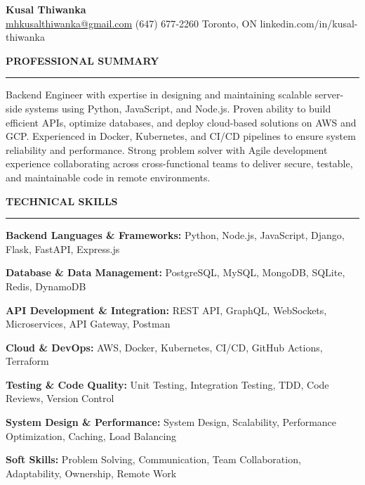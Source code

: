 \documentclass[10pt,letterpaper]{article}
\begin{document}
\begin{center}
{\LARGE\textbf{Kusal Thiwanka}}\\[3pt]
\href{mailto:mhkusalthiwanka@gmail.com}{mhkusalthiwanka@gmail.com}\hspace{2em}%
(647) 677{-}2260\hspace{2em}%
Toronto, ON\hspace{2em}
linkedin.com/in/kusal-thiwanka
\end{center}

\vspace{6pt}

\textbf{PROFESSIONAL SUMMARY}\\[-8pt]
\noindent\rule{\textwidth}{1pt}

\vspace{-2pt}

Backend Engineer with expertise in designing and maintaining scalable server-side systems using Python, JavaScript, and Node.js. Proven ability to build efficient APIs, optimize databases, and deploy cloud-based solutions on AWS and GCP. Experienced in Docker, Kubernetes, and CI/CD pipelines to ensure system reliability and performance. Strong problem solver with Agile development experience collaborating across cross-functional teams to deliver secure, testable, and maintainable code in remote environments.

\vspace{8pt}

\textbf{TECHNICAL SKILLS}\\[-8pt]
\noindent\rule{\textwidth}{1pt}

\vspace{-2pt}

\textbf{Backend Languages \& Frameworks:} Python, Node.js, JavaScript, Django, Flask, FastAPI, Express.js

\textbf{Database \& Data Management:} PostgreSQL, MySQL, MongoDB, SQLite, Redis, DynamoDB

\textbf{API Development \& Integration:} REST API, GraphQL, WebSockets, Microservices, API Gateway, Postman

\textbf{Cloud \& DevOps:} AWS, Docker, Kubernetes, CI/CD, GitHub Actions, Terraform

\textbf{Testing \& Code Quality:} Unit Testing, Integration Testing, TDD, Code Reviews, Version Control

\textbf{System Design \& Performance:} System Design, Scalability, Performance Optimization, Caching, Load Balancing

\textbf{Soft Skills:} Problem Solving, Communication, Team Collaboration, Adaptability, Ownership, Remote Work
\end{document}
